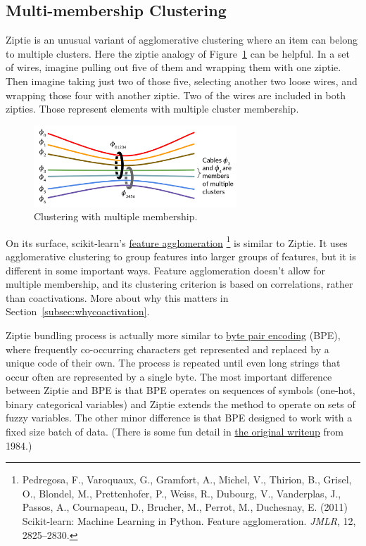 \subsection{Multi-membership Clustering}
\label{subsec:multimembership}

Ziptie is an unusual variant of agglomerative clustering where an item
can belong to multiple clusters. Here the ziptie analogy of
Figure~\ref{fig:multimember} can be helpful.
In a set of wires, imagine pulling out five of them and wrapping them
with one ziptie. Then imagine taking just two of those five, selecting another
two loose wires, and wrapping those four with another ziptie.
Two of the wires are included in both zipties. Those represent elements
with multiple cluster membership.

\begin{figure}[ht]
\vskip 0.0in
\begin{center}
\centerline{\includegraphics[width=3.0in]{images/multimember.png}}
\caption{Clustering with multiple membership.}
\label{fig:multimember}
\end{center}
\vskip -0.2in
\end{figure}

On its surface,
scikit-learn's
\href{https://scikit-learn.org/stable/auto_examples/cluster/plot_digits_agglomeration.html#sphx-glr-auto-examples-cluster-plot-digits-agglomeration-py}
{feature agglomeration}
\footnote{Pedregosa, F., Varoquaux, G., Gramfort, A., Michel, V.,
Thirion, B., Grisel, O., Blondel, M., Prettenhofer, P.,
Weiss, R., Dubourg, V., Vanderplas, J., Passos, A.,
Cournapeau, D., Brucher, M., Perrot, M., Duchesnay, E. (2011)
Scikit-learn: Machine Learning in Python. Feature agglomeration.
\textit{JMLR}, 12, 2825–2830.}
is similar to Ziptie.
It uses agglomerative clustering to group
features into larger groups of features, but it is different in
some important ways. Feature agglomeration doesn't allow for
multiple membership, and its clustering criterion is based on
correlations, rather than coactivations. More about why this matters in
Section~\ref{subsec:whycoactivation}.

Ziptie bundling process is actually more similar to
\href{https://en.wikipedia.org/wiki/Byte_pair_encoding}
{byte pair encoding} (BPE),
where frequently co-occurring characters get represented
and replaced by a unique code
of their own. The process is repeated until even long strings that
occur often are represented by a single byte.
The most important difference between Ziptie and BPE is that
BPE operates on sequences of symbols (one-hot, binary categorical variables)
and Ziptie extends the method to operate on sets of fuzzy variables.
The other minor difference is that BPE designed to work with a fixed
size batch of data. (There is some fun detail in
\href{http://www.pennelynn.com/Documents/CUJ/HTML/94HTML/19940045.HTM}
{the original writeup} from 1984.)

